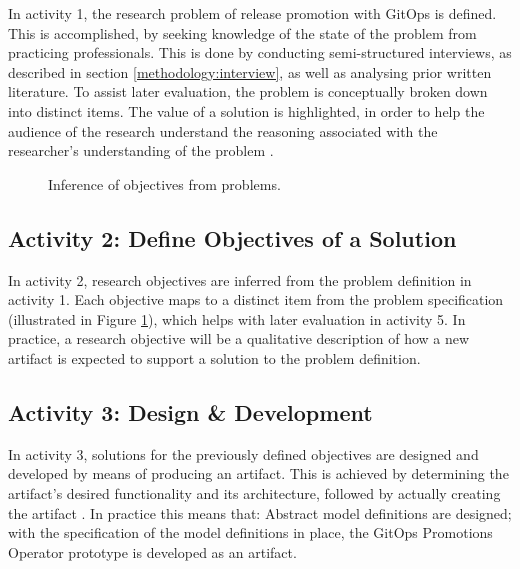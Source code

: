 \noindent
In activity 1,
the research problem of
release promotion with GitOps
is defined.
This is accomplished, by
seeking knowledge of the state of the problem
from practicing professionals.
This is done by conducting
semi-structured interviews, as described in section \ref{methodology:interview},
as well as analysing prior written literature.
To assist later evaluation,
the problem is conceptually broken down into distinct items.
The value of a solution is highlighted,
in order to help the audience of the research
understand the reasoning associated with the
researcher's understanding of the problem
\autocite{designScienceResearchMethodologyForInformationSystemsResearch}.
\bigskip

\begin{figure}[h]
	\centering
	\caption{Inference of objectives from problems.
	}
	\label{fig:problemToObjectiveMapping}	
\end{figure}

\subsection{Activity 2: Define Objectives of a Solution}
\label{methodology:activity2}

\noindent
In activity 2,
research objectives are inferred from the problem definition in activity 1.
Each objective maps to a distinct item from the problem specification
(illustrated in Figure \ref{fig:problemToObjectiveMapping}),
which helps with later evaluation in activity 5.
In practice, a research objective will be a qualitative description of
how a new artifact is expected to support a solution to the problem definition.
\bigskip

\subsection{Activity 3: Design \& Development}
\label{methodology:activity3}

\noindent
In activity 3,
solutions for the previously defined objectives are designed and developed
by means of producing an artifact.
This is achieved by
determining the artifact's desired functionality and its architecture,
followed by actually creating the artifact
\autocite{designScienceResearchMethodologyForInformationSystemsResearch}.
In practice this means that:
Abstract model definitions are designed;
with the specification of the model definitions in place,
the GitOps Promotions Operator prototype is developed as an artifact.
\bigskip

